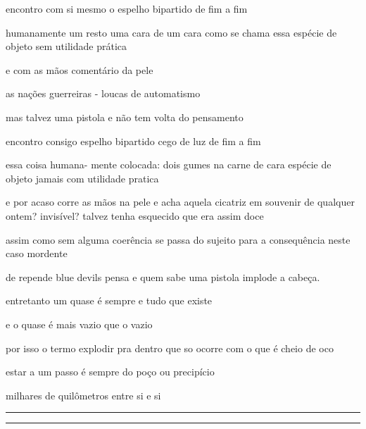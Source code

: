 \begin{poem}
\begin{stanza}
encontro com si mesmo\verseline
o espelho bipartido\verseline
de fim a fim
\end{stanza}
\begin{stanza}
humanamente um resto\verseline
uma cara de um cara\verseline
como se chama essa\verseline
espécie de objeto\verseline
sem utilidade prática
\end{stanza}
\begin{stanza}
e com as mãos\verseline
comentário da pele
\end{stanza}
\begin{stanza}
as nações guerreiras -\verseline
loucas de automatismo
\end{stanza}
\begin{stanza}
mas talvez uma pistola\verseline
e não tem volta\verseline
do pensamento
\end{stanza}
\begin{stanza}
encontro consigo\verseline
espelho bipartido\verseline
cego de luz\verseline
de fim a fim
\end{stanza}
\begin{stanza}
essa coisa humana-\verseline
mente colocada:\verseline
dois gumes na carne\verseline
de cara \quad espécie\verseline
de objeto jamais\verseline
com utilidade pratica
\end{stanza}
\begin{stanza}
e por acaso corre\verseline
as mãos na pele\verseline
e acha\verseline
aquela cicatriz\verseline
em souvenir\verseline
de qualquer ontem?\verseline
invisível? talvez\verseline
tenha esquecido\verseline
que era assim doce
\end{stanza}
\begin{stanza}
assim como\verseline
sem alguma coerência\verseline
se passa do sujeito\verseline
para a consequência\verseline
neste caso mordente
\end{stanza}
\begin{stanza}
de repende blue devils\verseline
pensa \quad e quem sabe\verseline
uma pistola\verseline
implode a cabeça.
\end{stanza}
\begin{stanza}
entretanto\verseline
um quase é sempre\verseline
e tudo que existe
\end{stanza}
\begin{stanza}
e o quase é mais\verseline
vazio que o vazio
\end{stanza}
\begin{stanza}
por isso o termo\verseline
explodir pra dentro\verseline
que so ocorre com\verseline
o que é cheio de oco
\end{stanza}
\begin{stanza}
estar a um passo\verseline
é sempre do poço\verseline
ou precipício
\end{stanza}
\begin{stanza}
milhares de\verseline
quilômetros\verseline
entre si e si
\end{stanza}
\end{poem}
\begin{center}{\rule{4cm}{0.4pt}\raisebox{-0.5ex}{x}\rule{4cm}{0.4pt}}\end{center}